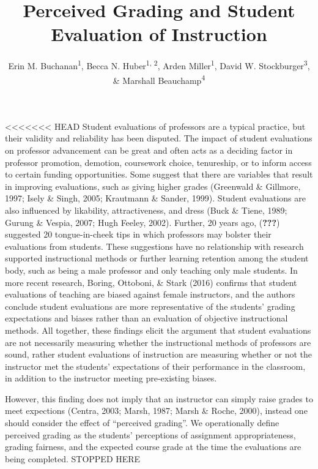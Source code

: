\documentclass[man]{apa6}
\title{Perceived Grading and Student Evaluation of Instruction}
\author{Erin M. Buchanan\textsuperscript{1}, Becca N. Huber\textsuperscript{1, 2}, Arden Miller\textsuperscript{1}, David W. Stockburger\textsuperscript{3}, \& Marshall Beauchamp\textsuperscript{4}}
\affiliation{
    \vspace{0.5cm}
          \textsuperscript{1} Missouri State University\\
          \textsuperscript{2} Idaho State University\\
          \textsuperscript{3} US Air Force Academy\\
          \textsuperscript{4} University of Missouri - Kansas City  }
\newcounter{author}
\theoremstyle{definition}
\theoremstyle{definition}
\theoremstyle{definition}
\theoremstyle{remark}
\begin{document}
\maketitle

\setcounter{secnumdepth}{0}



\textless{}\textless{}\textless{}\textless{}\textless{}\textless{}\textless{}
HEAD Student evaluations of professors are a typical practice, but their
validity and reliability has been disputed. The impact of student
evaluations on professor advancement can be great and often acts as a
deciding factor in professor promotion, demotion, coursework choice,
tenureship, or to inform access to certain funding opportunities. Some
suggest that there are variables that result in improving evaluations,
such as giving higher grades (Greenwald \& Gillmore, 1997; Isely \&
Singh, 2005; Krautmann \& Sander, 1999). Student evaluations are also
influenced by likability, attractiveness, and dress (Buck \& Tiene,
1989; Gurung \& Vespia, 2007; Hugh Feeley, 2002). Further, 20 years ago,
({\textbf{???}}) suggested 20 tongue-in-cheek tips in which professors
may bolster their evaluations from students. These suggestions have no
relationship with research supported instructional methods or further
learning retention among the student body, such as being a male
professor and only teaching only male students. In more recent research,
Boring, Ottoboni, \& Stark (2016) confirms that student evaluations of
teaching are biased against female instructors, and the authors conclude
student evaluations are more representative of the students' grading
expectations and biases rather than an evaluation of objective
instructional methods. All together, these findings elicit the argument
that student evaluations are not necessarily measuring whether the
instructional methods of professors are sound, rather student
evaluations of instruction are measuring whether or not the instructor
met the students' expectations of their performance in the classroom, in
addition to the instructor meeting pre-existing biases.

However, this finding does not imply that an instructor can simply raise
grades to meet expections (Centra, 2003; Marsh, 1987; Marsh \& Roche,
2000), instead one should consider the effect of \enquote{perceived
grading}. We operationally define perceived grading as the students'
perceptions of assignment appropriateness, grading fairness, and the
expected course grade at the time the evaluations are being completed.
STOPPED HERE
\end{document}
